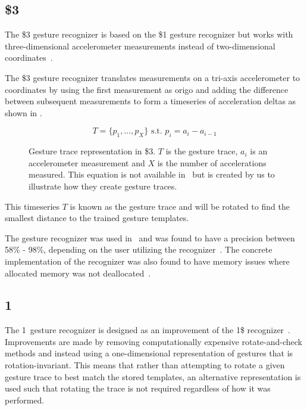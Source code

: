 
\subsection{\$3}

The \$3 gesture recognizer is based on the \$1 gesture recognizer but works with three-dimensional accelerometer measurements instead of two-dimensional coordinates~\cite{threedollar}.

The \$3 gesture recognizer translates measurements on a tri-axis accelerometer to coordinates by using the first measurement as origo and adding the difference between subsequent measurements to form a timeseries of acceleration deltas as shown in .

\begin{figure}[h]
\[ T = \{p_1,\ldots,p_X\} \text{ s.t. } p_i=a_i-a_{i-1} \]
\caption{Gesture trace representation in \$3. $T$ is the gesture trace, $a_i$ is an accelerometer measurement and $X$ is the number of accelerations measured.
This equation is not available in~\cite{threedollar} but is created by us to illustrate how they create gesture traces.}
\label{eq:acceleration-timeseries}
\end{figure}

This timeseries $T$ is known as the gesture trace and will be rotated to find the smallest distance to the trained gesture templates.

The gesture recognizer was used in~\cite{prespecialisation} and was found to have a precision between 58\% - 98\%, depending on the user utilizing the recognizer~\cite[p. 344]{threedollar}. The concrete implementation of the recognizer was also found to have memory issues where allocated memory was not deallocated~\cite[p. 54]{prespecialisation}.

\subsection{1\textcent}

The 1\textcent~gesture recognizer is designed as an improvement of the 1\$ recognizer~\cite{wobbrock2007gestures}. Improvements are made by removing computationally expensive rotate-and-check methods and instead using a one-dimensional representation of gestures that is rotation-invariant.
This means that rather than attempting to rotate a given gesture trace to best match the stored templates, an alternative representation is used such that rotating the trace is not required regardless of how it was performed.

